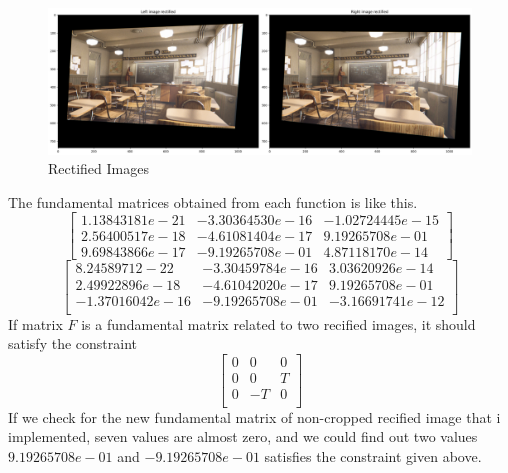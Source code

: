 \begin{figure}[h]
    \centering
    \includegraphics[width=12cm]{../result/rectified_imgs_result.png}
    \caption{Rectified Images}
    \label{fig:result1}
\end{figure}
The fundamental matrices obtained from each function is like this.
\[\left[
\begin{matrix}
    1.13843181e-21 & -3.30364530e-16 & -1.02724445e-15\\
    2.56400517e-18 & -4.61081404e-17 & 9.19265708e-01\\
    9.69843866e-17 & -9.19265708e-01 & 4.87118170e-14
\end{matrix}
\right] \]
\[\left[
\begin{matrix}
    8.24589712-22 & -3.30459784e-16 & 3.03620926e-14\\
    2.49922896e-18 & -4.61042020e-17 & 9.19265708e-01\\
    -1.37016042e-16 & -9.19265708e-01 & -3.16691741e-12\\
\end{matrix}
\right]\]
If matrix $F$ is a fundamental matrix related to two recified images, it should satisfy the constraint
\[\left[
    \begin{matrix}
        0 & 0 & 0\\
        0 & 0 & T\\
        0 & -T & 0\\
    \end{matrix}
\right]\]
If we check for the new fundamental matrix of non-cropped recified image that i implemented, seven values are almost zero, and we could find out
two values $9.19265708e-01$ and $-9.19265708e-01$ satisfies the constraint given above.

